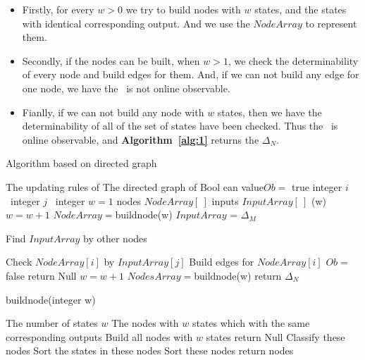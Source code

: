 \begin{itemize}
\item  Firstly, for every $w>0$ we try to build nodes with $w$ states, and the states with identical corresponding output. And we use the $NodeArray$ to represent them.
\item Secondly, if the nodes can  be built, when $w>1$, we check the determinability of every node and build edges for them. And, if we can not build any edge for one node, we have the \BCN\ is not online observable.
\item Fianlly, if we can not build any node with $w$ states, then we have the determinability of all of the set of states have been checked. Thus the \BCN\ is online observable, and {\bf Algorithm~\ref{alg:1}} returns the $\Delta_N$.
 \end{itemize}

\begin{algorithm}[h]
\caption{Algorithm based on directed graph}
\begin{algorithmic}[1]
\REQUIRE 
The updating rules of \BCN
\ENSURE  
The directed graph of \BCN
\STATE Bool ean value$Ob=$ true 
\STATE integer $i$ \
\STATE integer $j$ \
\STATE integer $w=1$
\STATE nodes $NodeArray[\ ]$
\STATE inputs $InputArray[\ ]$
(w)
\STATE $w= w+1$
\STATE $NodeArray=${\sf buildnode}(w)
\IF{($p==2$)}
\STATE $InputArray$ = $\Delta_M$ 
\ELSE

\STATE Find $InputArray$ by other nodes

\ENDIF
{}
\STATE Check $NodeArray[i]$ by $InputArray[j]$ 
\STATE Build edges for $NodeArray[i]$ 
\ENDFOR
{}
\STATE  $Ob=$ false 
\STATE return Null
\ENDIF
\ENDFOR
\STATE $w= w+1$
\STATE $NodesArray=${\sf buildnode}(w)
\ENDWHILE
\STATE return $\Delta_N$\
\end{algorithmic}
 \label{alg:1}
\end{algorithm}
\begin{algorithm}[h!]
\caption{{\sf buildnode}(integer w)}
\begin{algorithmic}[1]
\REQUIRE 
The number of states $w$
\ENSURE  
The nodes with $w$ states which with the same corresponding outputs 
\STATE  Build all nodes with $w$ states 
\STATE  return Null
\ELSE 
\STATE  Classify these nodes
\STATE Sort the states in these nodes
\STATE Sort these nodes
\STATE return nodes
\ENDIF 
\end{algorithmic}
 \label{alg:2}
\end{algorithm}

